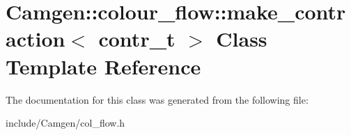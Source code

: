\hypertarget{a00338}{\section{Camgen\-:\-:colour\-\_\-flow\-:\-:make\-\_\-contraction$<$ contr\-\_\-t $>$ Class Template Reference}
\label{a00338}
}


The documentation for this class was generated from the following file\-:\begin{DoxyCompactItemize}
\item 
include/\-Camgen/col\-\_\-flow.\-h\end{DoxyCompactItemize}
